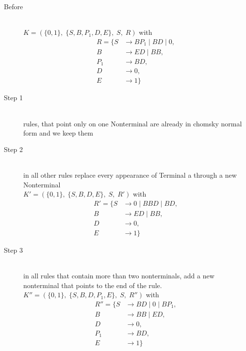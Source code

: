 \documentclass{article}
\begin{document}
\begin{description}
	\item[Before] \hfill \\ 
		$K=\left(\{	0, 1\},\;\{ S, B, P_1, D, E\},\;S,\;R\right)$ with
	\begin{align*}
		R=\{	S &\rightarrow BP_1\;|\;BD\;|\;0, \\ 
		B &\rightarrow ED\;|\;BB, \\ 
		P_1 &\rightarrow BD, \\ 
		D &\rightarrow 0, \\ 
		E &\rightarrow 1\}
	\end{align*}
	\item[Step 1] \hfill \\ 
	rules, that point only on one Nonterminal are already in chomsky normal form and we keep them\\ 
		\item[Step 2] \hfill \\ 
	in all other rules replace every appearance of Terminal a through a new Nonterminal\\ 
	$K'=\left(\{	0, 1\},\;\{ S, B, D, E\},\;S,\;R'\right)$ with
	\begin{align*}
		R'=\{	S &\rightarrow 0\;|\;BBD\;|\;BD, \\ 
		B &\rightarrow ED\;|\;BB, \\ 
		D &\rightarrow 0, \\ 
		E &\rightarrow 1\}
	\end{align*}
	\item[Step 3] \hfill \\ 
	in all rules that contain more than two nonterminals, add a new nonterminal that points to the end of the rule.\\ 
	$K''=\left(\{	0, 1\},\;\{ S, B, D, P_1, E\},\;S,\;R''\right)$ with
	\begin{align*}
		R''=\{	S &\rightarrow BD\;|\;0\;|\;BP_1, \\ 
		B &\rightarrow BB\;|\;ED, \\ 
		D &\rightarrow 0, \\ 
		P_1 &\rightarrow BD, \\ 
		E &\rightarrow 1\}
	\end{align*}
\end{description}
\end{document}
